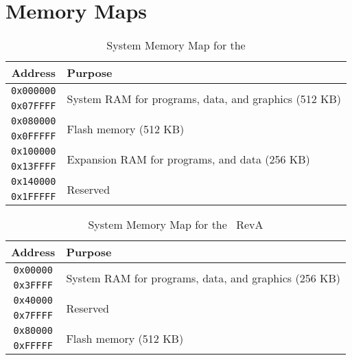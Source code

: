 \chapter{Memory Maps}

\begin{table}[ht]
    \begin{center}
        \begin{tabular}{|c|l|} \hline
            Address & Purpose \\ \hline\hline
            \verb+0x000000+ & \multirow{2}{*}{System RAM for programs, data, and graphics (512 KB)} \\ \cline{1-1}
            \verb+0x07FFFF+ & \\ \hline
            \verb+0x080000+ & \multirow{2}{*}{Flash memory (512 KB)} \\ \cline{1-1}
            \verb+0x0FFFFF+ & \\ \hline
            \verb+0x100000+ & \multirow{2}{*}{Expansion RAM for programs, and data (256 KB)} \\ \cline{1-1}
            \verb+0x13FFFF+ & \\ \hline
            \verb+0x140000+ & \multirow{2}{*}{Reserved} \\ \cline{1-1}
            \verb+0x1FFFFF+ & \\ \hline
        \end{tabular}
    \end{center}
    \caption{System Memory Map for the \jr}
    \label{tab:sys_mem_map}
\end{table}

\begin{table}[ht]
    \begin{center}
        \begin{tabular}{|c|l|} \hline
            Address & Purpose \\ \hline\hline
            \verb+0x00000+ & \multirow{2}{*}{System RAM for programs, data, and graphics (256 KB)} \\ \cline{1-1}
            \verb+0x3FFFF+ & \\ \hline
            \verb+0x40000+ &  \multirow{2}{*}{Reserved} \\ \cline{1-1}
            \verb+0x7FFFF+ & \\ \hline
            \verb+0x80000+ & \multirow{2}{*}{Flash memory (512 KB)} \\ \cline{1-1}
            \verb+0xFFFFF+ & \\ \hline
        \end{tabular}
    \end{center}
    \caption{System Memory Map for the \jr\ RevA}
    \label{tab:sys_mem_map_reva}
\end{table}

